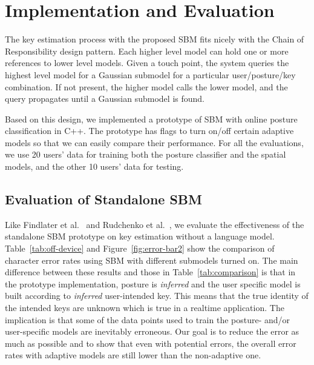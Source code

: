 \documentclass{sigchi}
\begin{document}
\pagebreak
\section{Implementation and Evaluation}
The key estimation process with the proposed SBM fits nicely with the
Chain of Responsibility design pattern. Each higher level model can
hold one or more references to lower level models. Given a touch
point, the system queries the highest level model for a Gaussian
submodel for a particular user/posture/key combination. If not present, 
the higher model calls the lower model, and the
query propagates until a Gaussian submodel is found. 

Based on this design, we implemented a prototype of SBM with online posture 
classification in C++. The prototype has flags to turn on/off certain adaptive
 models so that we can easily compare their performance. 
 For all the evaluations, we use 20 users' data for training both the posture classifier 
 and the spatial models, and the other 10 users' data for testing. 

\subsection{Evaluation of Standalone SBM}
Like Findlater et al.~\cite{Findlater:2012} and Rudchenko et al.~\cite{Rudchenko:2011}, we evaluate the effectiveness of the standalone SBM  prototype on key estimation without a language model. 
Table~\ref{tab:off-device} and Figure~\ref{fig:error-bar2} show the comparison of
character error rates using SBM with different submodels turned on. The main
difference between these results and those in Table~\ref{tab:comparison} is that
in the prototype implementation,  posture is \textit{inferred} and the user 
specific model is built according to \textit{inferred} user-intended key. This
means that the true identity of the intended keys are unknown which is true
in a realtime application. The implication is that some of the data points used
to train the posture- and/or user-specific models are inevitably erroneous. Our
goal is to reduce the error as much as possible and to show that even with
potential errors, the overall error rates with adaptive models are still  lower
than the non-adaptive one.
\end{document}
